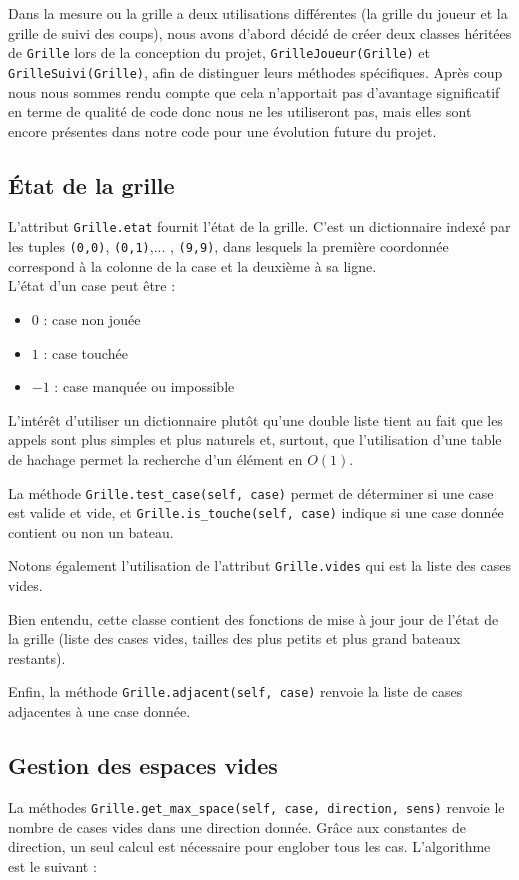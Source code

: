 Dans la mesure ou la grille a deux utilisations différentes (la grille du joueur et la grille de suivi des coups), nous avons d'abord décidé de créer deux classes héritées de \texttt{Grille} lors de la conception du projet, \texttt{GrilleJoueur(Grille)} et \texttt{GrilleSuivi(Grille)}, afin de distinguer leurs méthodes spécifiques. Après coup nous nous sommes rendu compte que cela n'apportait pas d'avantage significatif en terme de qualité de code donc nous ne les utiliseront pas, mais elles sont encore présentes dans notre code pour une évolution future du projet.

\subsection{État de la grille}

L'attribut \texttt{Grille.etat} fournit l'état de la grille. C'est un dictionnaire indexé par les tuples \texttt{(0,0)}, \texttt{(0,1)},... , \texttt{(9,9)}, dans lesquels la première coordonnée correspond à la colonne de la case et la deuxième à sa ligne.\\
L'état d'un case peut être :
\begin{itemize}
\item $0$ : case non jouée
\item $1$ : case touchée
\item $-1$ : case manquée ou impossible
\end{itemize}
L'intérêt d'utiliser un dictionnaire plutôt qu'une double liste tient au fait que les appels sont plus simples et plus naturels et, surtout, que l'utilisation d'une table de hachage permet la recherche d'un élément en $O(1)$.  

La méthode \texttt{Grille.test\_case(self, case)} permet de déterminer si une case est valide et vide, et \texttt{Grille.is\_touche(self, case)} indique si une case donnée contient ou non un bateau.

Notons également l'utilisation de l'attribut \texttt{Grille.vides} qui est la liste des cases vides.

Bien entendu, cette classe contient des fonctions de mise à jour jour de l'état de la grille (liste des cases vides, tailles des plus petits et plus grand bateaux restants).

Enfin, la méthode \texttt{Grille.adjacent(self, case)} renvoie la liste de cases adjacentes à une case donnée.

\subsection{Gestion des espaces vides}
La méthodes \texttt{Grille.get\_max\_space(self, case, direction, sens)} renvoie le nombre de cases vides dans une direction donnée. Grâce aux constantes de direction, un seul calcul est nécessaire pour englober tous les cas. L'algorithme est le suivant :

